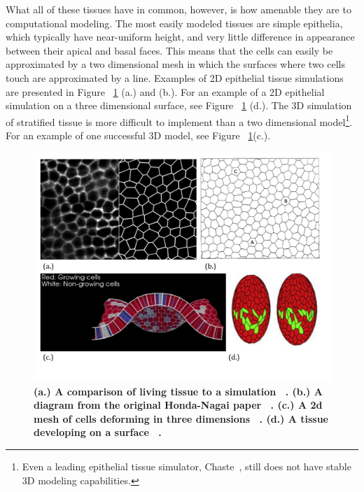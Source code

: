 What all of these tissues have in common, however, is how amenable they are to computational modeling. The most easily modeled tissues are simple epithelia, which typically have near-uniform height, and very little difference in appearance between their apical and basal faces. This means that the cells can easily be approximated by a two dimensional mesh in which the surfaces where two cells touch are approximated by a line. Examples of 2D epithelial tissue simulations are presented in Figure ~\ref{fig:fourgraphs} (a.) and (b.). For an example of a 2D epithelial simulation on a three dimensional surface, see Figure ~\ref{fig:fourgraphs} (d.). The 3D simulation of stratified tissue is more difficult to implement than a two dimensional model\footnote{Even a leading epithelial tissue simulator, Chaste~\cite{ChasteMain}, still does not have stable 3D modeling capabilities.}. For an example of one successful 3D model, see Figure ~\ref{fig:fourgraphs}(c.).

\begin{figure}[h]
    \centering
    \includegraphics[width=\textwidth]{../diagrams/abcd3.pdf}
    \caption[Various Models of Epithelial Tissue]{\textbf{(a.) A comparison of living tissue to a simulation ~\cite{Yoshi}. (b.) A diagram from the original Honda-Nagai paper ~\cite{HondaNagai}. (c.) A 2d mesh of cells deforming in three dimensions ~\cite{Okuda1}. (d.) A tissue developing on a surface ~\cite{VertexModels}.}}
    \label{fig:fourgraphs}
\end{figure}

